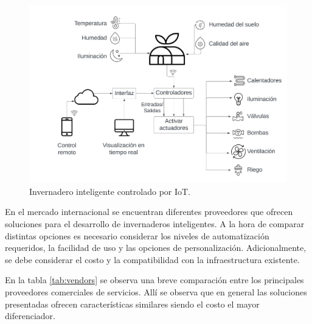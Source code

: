\begin{figure}[htpb]
\centering 
\includegraphics[width=.9\textwidth]{../Figures/SmartGreenhouse.jpeg}
\caption[Invernadero inteligente controlado por IoT]{Invernadero inteligente controlado por IoT\protect\footnotemark.}
\label{fig:imgInvernaderoInteligente}
\end{figure}





En el mercado internacional se encuentran diferentes proveedores que ofrecen soluciones para el desarrollo de invernaderos inteligentes. A la hora de comparar distintas opciones es necesario considerar los niveles de automatización requeridos, la facilidad de uso y las opciones de personalización. Adicionalmente, se debe considerar el costo y la compatibilidad con la infraestructura existente. 

En la tabla \ref{tab:vendors} se observa una breve comparación entre los principales proveedores comerciales de servicios. Allí se observa que en general las soluciones presentadas ofrecen características similares siendo el costo el mayor diferenciador.



